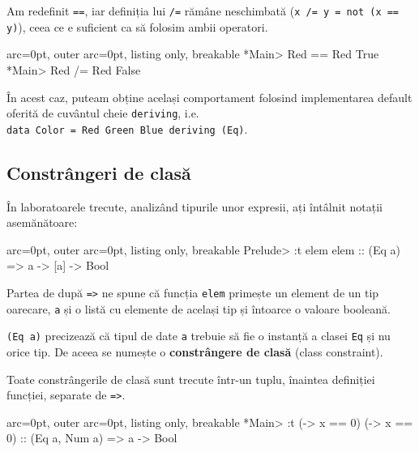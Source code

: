 Am redefinit \texttt{==}, iar definiția lui \texttt{/=} rămâne neschimbată (\texttt{x /= y = not (x == y)}), ceea ce e suficient ca să folosim ambii operatori.


\begin{tcblisting}{ arc=0pt, outer arc=0pt, listing only, breakable}
*Main> Red == Red
True
*Main> Red /= Red
False

\end{tcblisting}


\begin{tcolorbox}[colback=blue!10, colframe=blue!20]
În acest caz, puteam obține același comportament folosind implementarea default oferită de cuvântul cheie \texttt{deriving}, i.e.\\\texttt{data Color = Red \textbar Green \textbar Blue deriving (Eq)}.
\end{tcolorbox}

\subsection*{ Constrângeri de clasă }

În laboratoarele trecute, analizând tipurile unor expresii, ați întâlnit notații asemănătoare:


\begin{tcblisting}{ arc=0pt, outer arc=0pt, listing only, breakable}
Prelude> :t elem
elem :: (Eq a) => a -> [a] -> Bool

\end{tcblisting}


Partea de după \texttt{=\textgreater } ne spune că funcția \texttt{elem} primește un element de un tip oarecare, \texttt{a} și o listă cu elemente de același tip și întoarce o valoare booleană.

\texttt{(Eq a)} precizează că tipul de date \texttt{a} trebuie să fie o instanță a clasei \texttt{Eq} și nu orice tip. De aceea se numește o \textbf{constrângere de clasă} (class constraint).

\begin{tcolorbox}[colback=blue!10, colframe=blue!20]
Toate constrângerile de clasă sunt trecute într-un tuplu, înaintea definiției funcției, separate de \texttt{=\textgreater }.


\begin{tcblisting}{ arc=0pt, outer arc=0pt, listing only, breakable}
*Main> :t (\x -> x == 0)
(\x -> x == 0) :: (Eq a, Num a) => a -> Bool

\end{tcblisting}

\end{tcolorbox}

